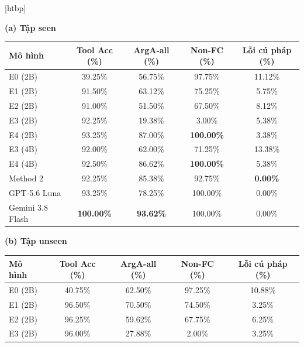 \documentclass[10pt,twocolumn,a4paper]{article}
\makeatletter
\renewenvironment{table}{\@dblfloat{table}}{\end@dblfloat}
\newcommand{\tabletext}{\small}
\makeatother
\begin{document}
\begin{table}[htbp]
    \centering
    \caption{Kết quả trên CustomTools-VI (800 mẫu seen và 800 mẫu unseen)}
    \label{tab:custom-results}
    \tabletext
    \textbf{(a) Tập seen}\\[2pt]
        \begin{tabular*}{\textwidth}{@{\extracolsep{\fill}}lcccc@{}}
            \toprule
            \textbf{Mô hình} & \textbf{Tool Acc (\%)} & \textbf{ArgA-all (\%)} & \textbf{Non-FC (\%)} & \textbf{Lỗi cú pháp (\%)} \\
            \midrule
            E0 (2B) & 39.25\% & 56.75\% & 97.75\% & 11.12\% \\
            E1 (2B) & 91.50\% & 63.12\% & 75.25\% & 5.75\% \\
            E2 (2B) & 91.00\% & 51.50\% & 67.50\% & 8.12\% \\
            E3 (2B) & 92.25\% & 19.38\% & 3.00\% & 5.38\% \\
            E4 (2B) & 93.25\% & 87.00\% & \textbf{100.00\%} & 3.38\% \\
            E3 (4B) & 92.00\% & 62.00\% & 71.25\% & 13.38\% \\
            E4 (4B) & 92.50\% & 86.62\% & \textbf{100.00\%} & 5.38\% \\
            Method 2 & 92.25\% & 85.38\% & 92.75\% & \textbf{0.00\%} \\
            GPT-5.6 Luna & 93.25\% & 78.25\% & 100.00\% & 0.00\% \\
            Gemini 3.8 Flash & \textbf{100.00\%} & \textbf{93.62\%} & 100.00\% & 0.00\% \\
        \bottomrule
    \end{tabular*}
    \par\medskip
    \textbf{(b) Tập unseen}\\[2pt]
        \begin{tabular*}{\textwidth}{@{\extracolsep{\fill}}lcccc@{}}
            \toprule
            \textbf{Mô hình} & \textbf{Tool Acc (\%)} & \textbf{ArgA-all (\%)} & \textbf{Non-FC (\%)} & \textbf{Lỗi cú pháp (\%)} \\
            \midrule
            E0 (2B) & 40.75\% & 62.50\% & 97.25\% & 10.88\% \\
            E1 (2B) & 96.50\% & 70.50\% & 74.50\% & 3.25\% \\
            E2 (2B) & 96.25\% & 59.62\% & 67.75\% & 6.25\% \\
            E3 (2B) & 96.00\% & 27.88\% & 2.00\% & 3.25\% \\

\end{tabular*}
\end{table}
\end{document}
